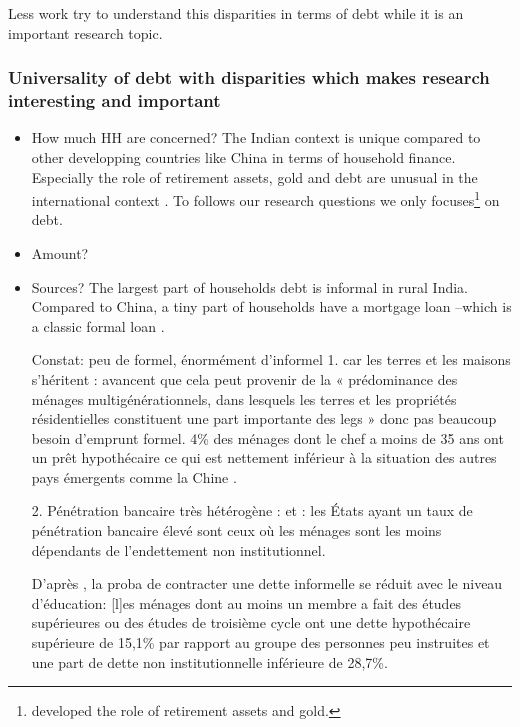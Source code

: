 \documentclass[a4paper, 11pt, onecolumn]{article}
\begin{document}
Less work try to understand this disparities in terms of debt while it is an important research topic.
		
		\subsubsection{Universality of debt with disparities which makes research interesting and important}
\begin{itemize}
\item How much HH are concerned?
The Indian context is unique compared to other developping countries like China in terms of household finance.
Especially the role of retirement assets, gold and debt are unusual in the international context \citep{Badarinza2016b}.
To follows our research questions we only focuses\footnote{\cite{Badarinza2016b} developed the role of retirement assets and gold.} on debt.

\item Amount?
\item Sources?
The largest part of households debt is informal in rural India.
Compared to China, a tiny part of households have a mortgage loan --which is a classic formal loan \citep{Badarinza2016b}.

Constat: peu de formel, énormément d'informel
1. car les terres et les maisons s'héritent : \citep{Badarinza2016b} avancent que cela peut provenir de la « prédominance des ménages multigénérationnels, dans lesquels les terres et les propriétés résidentielles constituent une part importante des legs » donc pas beaucoup besoin d'emprunt formel. 4\% des ménages dont le chef a moins de 35 ans ont un prêt hypothécaire ce qui est nettement inférieur à la situation des autres pays émergents comme la Chine \citep{Badarinza2016b}.

2. Pénétration bancaire très hétérogène : \citep{Badarinza2016b} et \citep{Burgess2005} : les États ayant un taux de pénétration bancaire élevé sont ceux où les ménages sont les moins dépendants de l’endettement non institutionnel.

D'après \citep{Badarinza2016b}, la proba de contracter une dette informelle se réduit avec le niveau d'éducation: [l]es ménages dont au moins un membre a fait des études supérieures ou des études de troisième cycle ont une dette hypothécaire supérieure de 15,1\% par rapport au groupe des personnes peu instruites et une part de dette non institutionnelle inférieure de 28,7\%.


\end{itemize}
\end{document}
